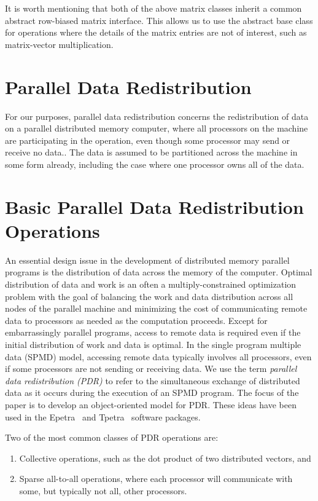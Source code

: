\documentclass[12pt,relax]{PetraObjectModel}
\begin{document}
It is worth mentioning that both of the above matrix classes inherit 
a common abstract row-biased matrix interface.  This allows us to use the
abstract base class for operations where the details of the matrix entries
are not of interest, such as matrix-vector multiplication.



\section{Parallel Data Redistribution}
For our purposes, parallel data redistribution concerns the redistribution of 
data on a parallel distributed memory computer, where all processors on the 
machine are participating in the operation, even though some processor may send
or receive no data..  The data is assumed to be 
partitioned across the machine in some form already, including the case where one
processor owns all of the data.


\section{Basic Parallel Data Redistribution Operations}

An essential design issue in the development of distributed memory parallel programs is the
distribution of data across the memory of the computer.  Optimal distribution of data and work
is an often a multiply-constrained optimization problem with the goal of balancing the work and
data distribution across all nodes of the parallel machine and minimizing the cost of
communicating remote data to processors as needed as the computation proceeds.
Except for embarrassingly parallel programs, access to remote data is required even if
the initial distribution of work and data is optimal.  In the single program multiple data
(SPMD) model, accessing remote data typically involves all processors, even if some processors
are not sending or receiving data.  We use the term {\it parallel data
redistribution (PDR)} to refer to the simultaneous exchange of distributed data as it occurs during
the execution of an SPMD program.  The focus of the paper is to develop an object-oriented
model for PDR.  These ideas have been used in the Epetra~\cite{Epetra-User-Guide} and
Tpetra~\cite{Tpetra-User-Guide} software packages.

Two of the most common classes of PDR operations are:
\begin{enumerate}
\item Collective operations, such as the dot
product of two distributed vectors, and 
\item Sparse all-to-all operations, where each processor will
communicate with some, but typically not all, other processors.
\end{enumerate}
\end{document}
